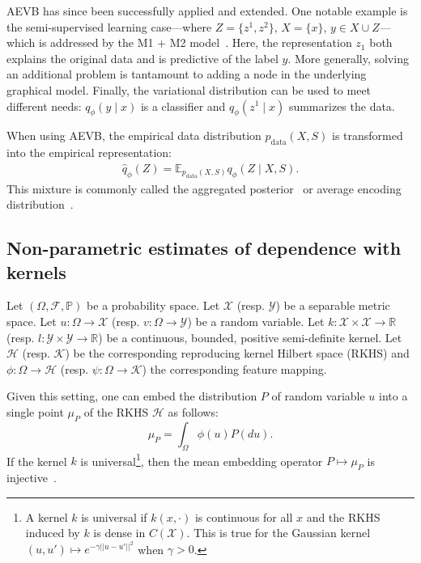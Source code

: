 AEVB has since been successfully applied and extended. One notable example is the semi-supervised learning case---where $Z = \{z^1, z^2\}$, $X = \{x\}$, $y \in X\cup Z$---which is addressed by the M1 + M2 model~\cite{DBLP:journals/corr/KingmaRMW14}. Here, the representation $z_1$ both explains the original data and is predictive of the label $y$. More generally, solving an additional problem is tantamount to adding a node in the underlying graphical model. Finally, the variational distribution can be used to meet different needs: $q_\phi(y \mid x)$ is a classifier and $q_\phi(z^1 \mid x)$ summarizes the data. 

When using AEVB, the empirical data distribution $p_\text{data}(X, S)$ is transformed into the empirical representation:
\begin{align}
	\hat{q}_\phi(Z) = \mathbb{E}_{p_\text{data}(X, S)}q_\phi(Z \mid X, S).
\end{align}
This mixture is commonly called the aggregated posterior~\cite{Makhzani2015} or average encoding distribution~\cite{Hoffman2016}.


\subsection{Non-parametric estimates of dependence with kernels}

Let $(\Omega, \mathcal{F}, \mathbb{P})$ be a probability space. Let $\mathcal{X}$ (resp. $\mathcal{Y}$) be a separable metric space. Let $u: \Omega \rightarrow \mathcal{X}$ (resp. $v: \Omega \rightarrow \mathcal{Y}$) be a random variable. Let $k: \mathcal{X} \times \mathcal{X} \rightarrow \mathbb{R}$ (resp. $l: \mathcal{Y} \times \mathcal{Y} \rightarrow \mathbb{R}$) be a continuous, bounded, positive semi-definite kernel. Let $\mathcal{H}$ (resp. $\mathcal{K}$) be the corresponding reproducing kernel Hilbert space (RKHS) and $\phi: \Omega \rightarrow \mathcal{H}$ (resp. $\psi:\Omega \rightarrow \mathcal{K}$) the corresponding feature mapping.

Given this setting, one can embed the distribution $P$ of random variable $u$ into a single point $\mu_P$ of the RKHS $\mathcal{H}$ as follows:
\begin{equation}
\mu_{P} = \int_{\Omega} \phi(u) P(du).
\label{hsicembedding}
\end{equation}
If the kernel $k$ is universal\footnote{A kernel $k$ is universal if $k(x,\cdot )$ is continuous for all $x$ and the RKHS induced by $k$ is dense in $C(\mathcal{X})$. This is true for the Gaussian kernel $(u, u') \mapsto e^{-\gamma || u - u'|| ^2}$ when $\gamma > 0$.}, then the mean embedding operator $P \mapsto \mu_P$ is injective~\cite{NIPS2007_3340}. 

